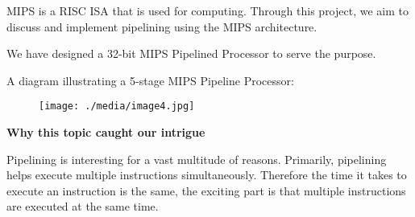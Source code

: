 \documentclass[12pt]{article}
\begin{document}
\vspace{\baselineskip}
{\fontsize{18pt}{21.6pt}\selectfont MIPS is a RISC ISA that is used for computing. Through this project, we aim to discuss and implement pipelining using the MIPS architecture.\par}\par


\vspace{\baselineskip}
{\fontsize{18pt}{21.6pt}\selectfont We have designed a 32-bit MIPS Pipelined Processor to serve the purpose.\par}\par


\vspace{\baselineskip}

\vspace{\baselineskip}

\vspace{\baselineskip}
{\fontsize{18pt}{21.6pt}\selectfont A diagram illustrating a 5-stage MIPS Pipeline Processor:\par}\par




\begin{figure}[H]
	\begin{Center}
		\texttt{[image: ./media/image4.jpg]}
	\end{Center}
\end{figure}



\par


\vspace{\baselineskip}

\vspace{\baselineskip}
{\fontsize{22pt}{26.4pt}\selectfont \textbf{Why this topic caught our intrigue}\par}\par


\vspace{\baselineskip}
{\fontsize{18pt}{21.6pt}\selectfont Pipelining is interesting for a vast multitude of reasons. Primarily, pipelining helps execute multiple instructions simultaneously. Therefore the time it takes to execute an instruction is the same, the exciting part is that multiple instructions are executed at the same time.\par}\par
\end{document}
